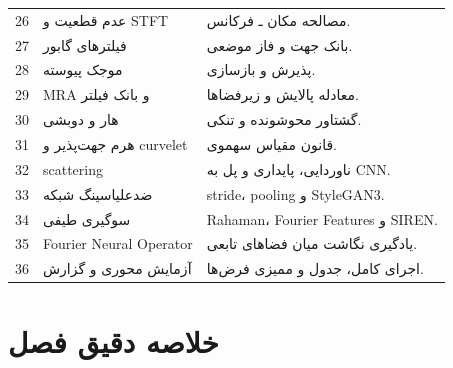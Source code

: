 \begin{videobox}
\begin{longtable}{p{}p{}p{}}
26 & عدم قطعیت و STFT & مصالحه مکان ـ فرکانس.\\
27 & فیلترهای گابور & بانک جهت و فاز موضعی.\\
28 & موجک پیوسته & پذیرش و بازسازی.\\
29 & MRA و بانک فیلتر & معادله پالایش و زیرفضاها.\\
30 & هار و دوبشی & گشتاور محوشونده و تنکی.\\
31 & هرم جهت‌پذیر و curvelet & قانون مقیاس سهموی.\\
32 & scattering & ناوردایی، پایداری و پل به CNN.\\
33 & ضدعلیاسینگ شبکه & stride، pooling و StyleGAN3.\\
34 & سوگیری طیفی & Rahaman، Fourier Features و SIREN.\\
35 & Fourier Neural Operator & یادگیری نگاشت میان فضاهای تابعی.\\
36 & آزمایش محوری و گزارش & اجرای کامل، جدول و ممیزی فرض‌ها.\\
\bottomrule
\end{longtable}
\end{videobox}

\section{خلاصه دقیق فصل}

